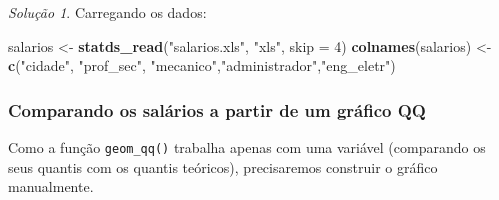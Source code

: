 \documentclass[
]{latex/krantz}
\newenvironment{Shaded}{\begin{snugshade}}{\end{snugshade}}
\newcommand{\AttributeTok}[1]{\textcolor[rgb]{0.13,0.29,0.53}{#1}}
\newcommand{\DecValTok}[1]{\textcolor[rgb]{0.00,0.00,0.81}{#1}}
\newcommand{\FloatTok}[1]{\textcolor[rgb]{0.00,0.00,0.81}{#1}}
\newcommand{\FunctionTok}[1]{\textcolor[rgb]{0.13,0.29,0.53}{\textbf{#1}}}
\newcommand{\NormalTok}[1]{#1}
\newcommand{\OtherTok}[1]{\textcolor[rgb]{0.56,0.35,0.01}{#1}}
\newcommand{\SpecialCharTok}[1]{\textcolor[rgb]{0.81,0.36,0.00}{\textbf{#1}}}
\newcommand{\StringTok}[1]{\textcolor[rgb]{0.31,0.60,0.02}{#1}}
\theoremstyle{definition}
\theoremstyle{definition}
\theoremstyle{definition}
\theoremstyle{definition}
\theoremstyle{remark}
\newtheorem*{solution}{Solução}
\begin{document}
\begin{solution}
Carregando os dados:

\begin{Shaded}
\begin{Highlighting}[]
\NormalTok{salarios }\OtherTok{\textless{}{-}} \FunctionTok{statds\_read}\NormalTok{(}\StringTok{"salarios.xls"}\NormalTok{, }\StringTok{"xls"}\NormalTok{, }\AttributeTok{skip =} \DecValTok{4}\NormalTok{)}
\FunctionTok{colnames}\NormalTok{(salarios) }\OtherTok{\textless{}{-}} \FunctionTok{c}\NormalTok{(}\StringTok{"cidade"}\NormalTok{, }\StringTok{"prof\_sec"}\NormalTok{, }\StringTok{"mecanico"}\NormalTok{,}\StringTok{"administrador"}\NormalTok{,}\StringTok{"eng\_eletr"}\NormalTok{)}
\end{Highlighting}
\end{Shaded}

\hypertarget{comparando-os-saluxe1rios-a-partir-de-um-gruxe1fico-qq}{%
\subsubsection*{Comparando os salários a partir de um gráfico QQ}\label{comparando-os-saluxe1rios-a-partir-de-um-gruxe1fico-qq}}

Como a função \texttt{geom\_qq()} trabalha apenas com uma variável (comparando os seus quantis com os quantis teóricos), precisaremos construir o gráfico manualmente.

\begin{Shaded}
\end{Shaded}
\end{solution}
\end{document}
